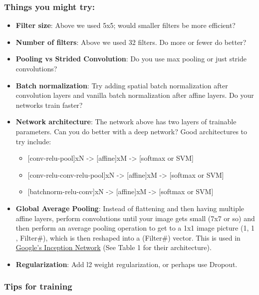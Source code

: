 \documentclass[11pt]{article}
\providecommand{\tightlist}{%
      \setlength{\itemsep}{0pt}\setlength{\parskip}{0pt}}
\begin{document}
\hypertarget{things-you-might-try}{%
\subsubsection{Things you might try:}\label{things-you-might-try}}

\begin{itemize}
\tightlist
\item
  \textbf{Filter size}: Above we used 5x5; would smaller filters be more
  efficient?
\item
  \textbf{Number of filters}: Above we used 32 filters. Do more or fewer
  do better?
\item
  \textbf{Pooling vs Strided Convolution}: Do you use max pooling or
  just stride convolutions?
\item
  \textbf{Batch normalization}: Try adding spatial batch normalization
  after convolution layers and vanilla batch normalization after affine
  layers. Do your networks train faster?
\item
  \textbf{Network architecture}: The network above has two layers of
  trainable parameters. Can you do better with a deep network? Good
  architectures to try include:

  \begin{itemize}
  \tightlist
  \item
    {[}conv-relu-pool{]}xN -\textgreater{} {[}affine{]}xM
    -\textgreater{} {[}softmax or SVM{]}
  \item
    {[}conv-relu-conv-relu-pool{]}xN -\textgreater{} {[}affine{]}xM
    -\textgreater{} {[}softmax or SVM{]}
  \item
    {[}batchnorm-relu-conv{]}xN -\textgreater{} {[}affine{]}xM
    -\textgreater{} {[}softmax or SVM{]}
  \end{itemize}
\item
  \textbf{Global Average Pooling}: Instead of flattening and then having
  multiple affine layers, perform convolutions until your image gets
  small (7x7 or so) and then perform an average pooling operation to get
  to a 1x1 image picture (1, 1 , Filter\#), which is then reshaped into
  a (Filter\#) vector. This is used in
  \href{https://arxiv.org/abs/1512.00567}{Google's Inception Network}
  (See Table 1 for their architecture).
\item
  \textbf{Regularization}: Add l2 weight regularization, or perhaps use
  Dropout.
\end{itemize}

\hypertarget{tips-for-training}{%
\subsubsection{Tips for training}\label{tips-for-training}}
\end{document}
